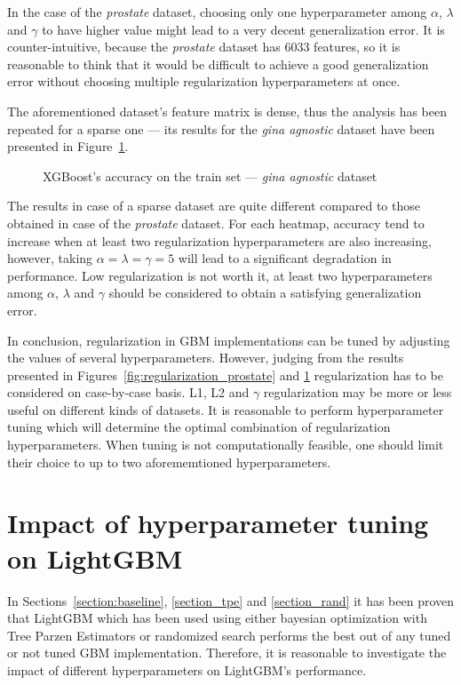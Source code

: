 \documentclass[magisterska, english]{pwr_wmat_praca_dyplomowa}
\theoremstyle{plain}
\numberwithin{theorem}{chapter}
\theoremstyle{definition}
\numberwithin{theorem}{chapter}
\begin{document}
In the case of the \emph{prostate} dataset, choosing only one hyperparameter among $\alpha$, $\lambda$ and $\gamma$ to have higher value might lead to a very decent generalization error. It is counter-intuitive, because the \emph{prostate} dataset has 6033 features, so it is reasonable to think that it would be difficult to achieve a good generalization error without choosing multiple regularization hyperparameters at once. 

The aforementioned dataset's feature matrix is dense, thus the analysis has been repeated for a sparse one --- its results for the \emph{gina agnostic} dataset have been presented in Figure~\ref{fig:regularization_gina_agnostic}.

\begin{figure}[H]
	\centering
	\caption{XGBoost's accuracy on the train set --- \emph{gina agnostic} dataset}
	\label{fig:regularization_gina_agnostic}
\end{figure}

The results in case of a sparse dataset are quite different compared to those obtained in case of the \emph{prostate} dataset. For each heatmap, accuracy tend to increase when at least two regularization hyperparameters are also increasing, however, taking $\alpha=\lambda=\gamma=5$ will lead to a significant degradation in performance. Low regularization is not worth it, at least two hyperparameters among $\alpha$, $\lambda$ and $\gamma$ should be considered to obtain a satisfying generalization error. 

In conclusion, regularization in GBM implementations can be tuned by adjusting the values of several hyperparameters. However, judging from the results presented in Figures~\ref{fig:regularization_prostate} and \ref{fig:regularization_gina_agnostic} regularization has to be considered on case-by-case basis. L1, L2 and $\gamma$ regularization may be more or less useful on different kinds of datasets. It is reasonable to perform hyperparameter tuning which will determine the optimal combination of regularization hyperparameters. When tuning is not computationally feasible, one should limit their choice to up to two aforememtioned hyperparameters.

\section{Impact of hyperparameter tuning on LightGBM}
In Sections~\ref{section:baseline}, \ref{section_tpe} and \ref{section_rand} it has been proven that LightGBM which has been used using either bayesian optimization with Tree Parzen Estimators or randomized search performs the best out of any tuned or not tuned GBM implementation. Therefore, it is reasonable to investigate the impact of different hyperparameters on LightGBM's performance. 
\end{document}
